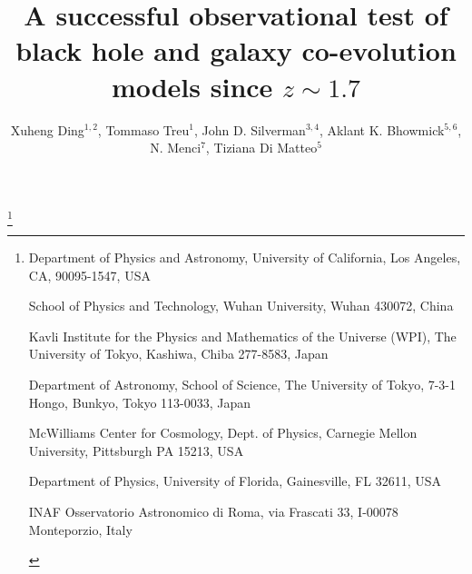 \documentclass{natureprintstyle}
\title{
A successful observational test of black hole and galaxy co-evolution models since $z\sim1.7$
}
\author{Xuheng Ding$^{1,2}$, 
Tommaso Treu$^{1}$, 
John D. Silverman$^{3, 4}$,
Aklant K. Bhowmick$^{5,6}$,
N. Menci$^{7}$,
Tiziana Di Matteo$^{5}$
}
\begin{document}
\maketitle

\let\thefootnote\relax\footnote{
\begin{affiliations}
\item {Department of Physics and Astronomy, University of California, Los Angeles, CA, 90095-1547, USA} 
\item {School of Physics and Technology, Wuhan University, Wuhan 430072, China}
\item {Kavli Institute for the Physics and Mathematics of the Universe (WPI), The University of Tokyo, Kashiwa, Chiba 277-8583, Japan}
\item {Department of Astronomy, School of Science, The University of Tokyo, 7-3-1 Hongo, Bunkyo, Tokyo 113-0033, Japan}
\item{McWilliams Center for Cosmology, Dept. of Physics, Carnegie Mellon University, Pittsburgh PA 15213, USA}
\item{Department of Physics, University of Florida, Gainesville, FL 32611, USA}
\item{INAF Osservatorio Astronomico di Roma, via Frascati 33, I-00078 Monteporzio, Italy}
\end{affiliations}
}
\end{document}
